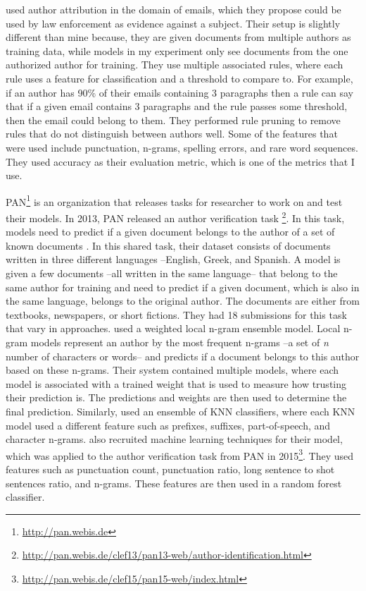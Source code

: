 \documentclass[11pt]{article}
\begin{document}
\cite{Schmid:2015} used author attribution in the domain of emails, which they propose could be used by law enforcement as evidence against a subject. Their setup is slightly different than mine because, they are given documents from multiple authors as training data, while models in my experiment only see documents from the one authorized author for training. They use multiple associated rules, where each rule uses a feature for classification and a threshold to compare to. For example, if an author has 90\% of their emails containing 3 paragraphs then a rule can say that if a given email contains 3 paragraphs and the rule passes some threshold, then the email could belong to them. They performed rule pruning to remove rules that do not distinguish between authors well. Some of the features that were used include punctuation, n-grams, spelling errors, and rare word sequences. They used accuracy as their evaluation metric, which is one of the metrics that I use.

PAN\footnote{\url{http://pan.webis.de}} is an organization that releases tasks for researcher to work on and test their models. In 2013, PAN released an author verification task \footnote{\url{http://pan.webis.de/clef13/pan13-web/author-identification.html}}. In this task, models need to predict if a given document belongs to the author of a set of known documents \cite{Stamatatos_e.:overview}. In this shared task, their dataset consists of documents written in three different languages --English, Greek, and Spanish. A model is given a few documents --all written in the same language-- that belong to the same author for training and need to predict if a given document, which is also in the same language, belongs to the original author. The documents are either from textbooks, newspapers, or short fictions. They had 18 submissions for this task that vary in approaches. \cite{layton:2013} used a weighted local n-gram ensemble model. Local n-gram models represent an author by the most frequent n-grams --a set of \textit{n} number of characters or words-- and predicts if a document belongs to this author based on these n-grams. Their system contained multiple models, where each model is associated with a trained weight that is used to measure how trusting their prediction is. The predictions and weights are then used to determine the final prediction. Similarly, \cite{halvani:2013} used an ensemble of KNN classifiers, where each KNN model used a different feature such as prefixes, suffixes, part-of-speech, and character n-grams. \cite{maitra} also recruited machine learning techniques for their model, which was applied to the author verification task from PAN in 2015\footnote{\url{http://pan.webis.de/clef15/pan15-web/index.html}}. They used features such as punctuation count, punctuation ratio, long sentence to shot sentences ratio, and n-grams. These features are then used in a random forest classifier.
\end{document}
